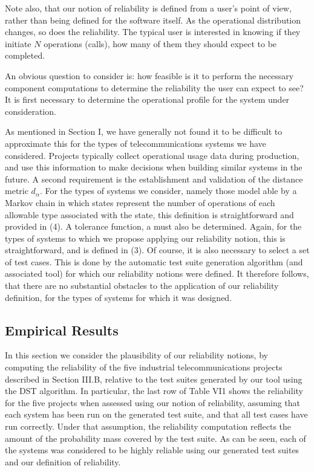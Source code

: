 \documentclass[journal, twoside]{IEEEtran}
\begin{document}
Note also, that our notion of reliability is defined from a
user’s point of view, rather than being defined for the software
itself. As the operational distribution changes, so does the reliability. The typical user is interested in knowing if they initiate $N$ operations (calls), how many of them they should expect to be completed. 

An obvious question to consider is: how feasible is it to perform the necessary component computations to determine the reliability the user can expect to see? It is first necessary to determine the operational profile for the system under consideration.
\vspace{2cm}

 As mentioned in Section I, we have generally not
found it to be difficult to approximate this for the types of telecommunications systems we have considered. Projects typically collect operational usage data during production, and use
this information to make decisions when building similar systems in the future. A second requirement is the establishment
and validation of the distance metric $d_\alpha$. For the types of systems we consider, namely those model able by a Markov chain
in which states represent the number of operations of each
allowable type associated with the state, this definition is
straightforward and provided in (4). A tolerance function, a
must also be determined. Again, for the types of systems to
which we propose applying our reliability notion, this is
straightforward, and is defined in (3). Of course, it is also necessary to select a set of test cases. This is done by the automatic test suite generation algorithm (and associated tool) for
which our reliability notions were defined. It therefore follows,
that there are no substantial obstacles to the application of our
reliability definition, for the types of systems for which it was
designed. 

\subsection{Empirical Results}
In this section we consider the plausibility of our reliability
notions, by computing the reliability of the five industrial telecommunications projects described in Section III.B, relative to
the test suites generated by our tool using the DST algorithm.
In particular, the last row of Table VI1 shows the reliability for
the five projects when assessed using our notion of reliability,
assuming that each system has been run on the generated test
suite, and that all test cases have run correctly. Under that assumption, the reliability computation reflects the amount of the
probability mass covered by the test suite. As can be seen,
each of the systems was considered to be highly reliable using
our generated test suites and our definition of reliability. 
\end{document}

